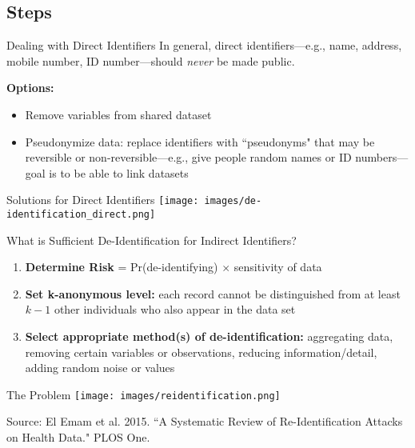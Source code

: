 \documentclass[12pt, compress]{beamer} %
\let\olditem\item %
\renewcommand{\item}{%
\olditem\vspace{\fill}}
\begin{document}
\subsection{Steps}

	\begin{frame}{Dealing with Direct Identifiers}
		In general, direct identifiers---e.g., name, address, mobile number, ID number---should \textit{never} be made public. 
		
		\bigskip
		
		
		\textbf{Options:}
		\begin{itemize}
			\item Remove variables from shared dataset
			\item Pseudonymize data: replace identifiers with ``pseudonyms" that may be reversible or non-reversible---e.g., give people random names or ID numbers---goal is to be able to link datasets
		\end{itemize}
	\end{frame}	
	
	\begin{frame}{Solutions for Direct Identifiers}
		 \centering \texttt{[image: images/de-identification\_direct.png]}
	\end{frame}
	
	\begin{frame}{What is Sufficient De-Identification for Indirect Identifiers?}
	
		\begin{enumerate}
			\item \textbf{Determine Risk} = Pr(de-identifying) $\times$ sensitivity of data
			\item \textbf{Set k-anonymous level:} each record cannot be distinguished from at least $k-1$ other individuals who also appear in the data set
			\item \textbf{Select appropriate method(s) of de-identification:} aggregating data, removing certain variables or observations, reducing information/detail, adding random noise or values 
		\end{enumerate}
	\end{frame}
	
	\begin{frame}{The Problem}
		 \centering \texttt{[image: images/reidentification.png]}
		 
		 \tiny{Source: El Emam et al. 2015. ``A Systematic Review of Re-Identification Attacks on Health Data." PLOS One. }
	\end{frame}
	
\end{document}
